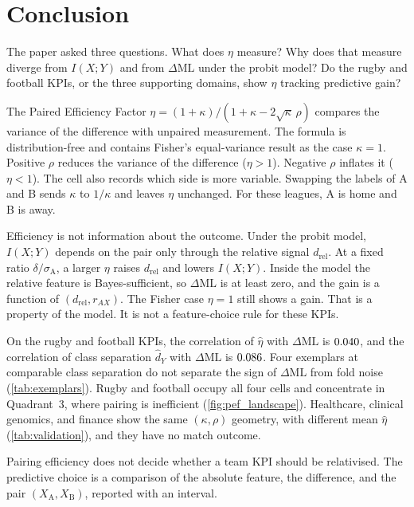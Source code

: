 \section{Conclusion}

The paper asked three questions.
What does $\eta$ measure?
Why does that measure diverge from $I(X;Y)$ and from $\Delta\mathrm{ML}$ under the probit model?
Do the rugby and football KPIs, or the three supporting domains, show $\eta$ tracking predictive gain?

The Paired Efficiency Factor $\eta=(1+\kappa)/(1+\kappa-2\sqrt{\kappa}\,\rho)$ compares the variance of the difference with unpaired measurement.
The formula is distribution-free and contains Fisher's equal-variance result as the case $\kappa=1$.
Positive $\rho$ reduces the variance of the difference ($\eta>1$).
Negative $\rho$ inflates it ($\eta<1$).
The cell also records which side is more variable.
Swapping the labels of A and B sends $\kappa$ to $1/\kappa$ and leaves $\eta$ unchanged.
For these leagues, A is home and B is away.

Efficiency is not information about the outcome.
Under the probit model, $I(X;Y)$ depends on the pair only through the relative signal $d_{\mathrm{rel}}$.
At a fixed ratio $\delta/\sigma_{\mathrm{A}}$, a larger $\eta$ raises $d_{\mathrm{rel}}$ and lowers $I(X;Y)$.
Inside the model the relative feature is Bayes-sufficient, so $\Delta\mathrm{ML}$ is at least zero, and the gain is a function of $(d_{\mathrm{rel}},r_{AX})$.
The Fisher case $\eta=1$ still shows a gain.
That is a property of the model.
It is not a feature-choice rule for these KPIs.

On the rugby and football KPIs, the correlation of $\hat\eta$ with $\Delta\mathrm{ML}$ is $0.040$, and the correlation of class separation $\hat d_Y$ with $\Delta\mathrm{ML}$ is $0.086$.
Four exemplars at comparable class separation do not separate the sign of $\Delta\mathrm{ML}$ from fold noise (\cref{tab:exemplars}).
Rugby and football occupy all four cells and concentrate in Quadrant~3, where pairing is inefficient (\cref{fig:pef_landscape}).
Healthcare, clinical genomics, and finance show the same $(\kappa,\rho)$ geometry, with different mean $\hat\eta$ (\cref{tab:validation}), and they have no match outcome.

Pairing efficiency does not decide whether a team KPI should be relativised.
The predictive choice is a comparison of the absolute feature, the difference, and the pair $(X_{\mathrm{A}},X_{\mathrm{B}})$, reported with an interval.
